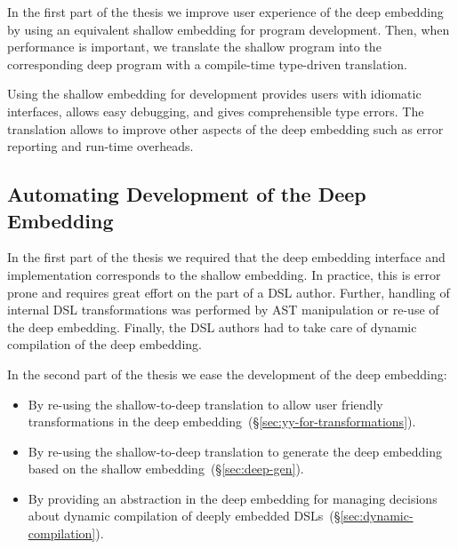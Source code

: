 In the first part of the thesis we improve user experience of the deep embedding by
 using an equivalent shallow embedding for program development. Then, when performance is
 important, we translate the shallow program into the corresponding deep program
 with a compile-time type-driven translation.

Using the shallow embedding for development provides users with idiomatic interfaces,
 allows easy debugging, and gives comprehensible type errors. The translation allows to improve other aspects of the deep embedding such as error reporting and run-time overheads.




\subsection{Automating Development of the Deep Embedding}
\label{sec:automating-developemnt}

 In the first part of the thesis we required that the deep embedding interface
 and implementation corresponds to the shallow embedding. In practice,
 this is error prone and requires great effort on the part of a DSL author. Further,
 handling of internal DSL transformations was performed by AST manipulation or
 re-use of the deep embedding. Finally, the DSL authors had to take care of dynamic
 compilation of the deep embedding.

 In the second part of the thesis we ease the development of the deep embedding: \begin{itemize}

   \item By re-using the shallow-to-deep translation to allow user friendly
    transformations in the deep embedding~(\S \ref{sec:yy-for-transformations}).

   \item By re-using the shallow-to-deep translation to generate the deep embedding based on the
    shallow embedding~(\S \ref{sec:deep-gen}).

   \item By providing an abstraction in the deep embedding for managing decisions about
     dynamic compilation of deeply embedded DSLs~(\S \ref{sec:dynamic-compilation}).

 \end{itemize}

